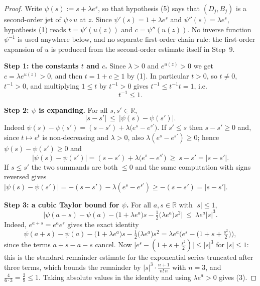 \begin{proof}
Write $\psi(s):=s+\lambda e^{s}$, so that hypothesis (5) says that $(D_j,B_j)$ is a
second-order jet of $\psi\circ u$ at $z$. Since $\psi'(s)=1+\lambda e^{s}$ and
$\psi''(s)=\lambda e^{s}$, hypothesis (1) reads $t=\psi'(u(z))$ and $c=\psi''(u(z))$. No
inverse function $\psi^{-1}$ is used anywhere below, and no separate first-order chain rule:
the first-order expansion of $u$ is produced from the second-order estimate itself in
Step~9.

\medskip\noindent\textbf{Step 1: the constants $t$ and $c$.} Since $\lambda>0$ and
$e^{u(z)}>0$ we get $c=\lambda e^{u(z)}>0$, and then $t=1+c\ge1$ by (1). In particular
$t>0$, so $t\ne0$, $t^{-1}>0$, and multiplying $1\le t$ by $t^{-1}>0$ gives
$t^{-1}\le t^{-1}t=1$, i.e.
\[
 t^{-1}\le1. \tag{1}
\]

\medskip\noindent\textbf{Step 2: $\psi$ is expanding.} For all $s,s'\in\mathbb R$,
\[
 |s-s'|\ \le\ |\psi(s)-\psi(s')| . \tag{2}
\]
Indeed $\psi(s)-\psi(s')=(s-s')+\lambda\big(e^{s}-e^{s'}\big)$. If $s'\le s$ then
$s-s'\ge0$ and, since $t\mapsto e^{t}$ is non-decreasing and $\lambda>0$, also
$\lambda(e^{s}-e^{s'})\ge0$; hence $\psi(s)-\psi(s')\ge0$ and
\[
 |\psi(s)-\psi(s')|=(s-s')+\lambda\big(e^{s}-e^{s'}\big)\ \ge\ s-s'=|s-s'| .
\]
If $s\le s'$ the two summands are both $\le0$ and the same computation with signs reversed
gives $|\psi(s)-\psi(s')|=-(s-s')-\lambda(e^{s}-e^{s'})\ge-(s-s')=|s-s'|$.

\medskip\noindent\textbf{Step 3: a cubic Taylor bound for $\psi$.} For all
$a,s\in\mathbb R$ with $|s|\le1$,
\[
 \Big|\psi(a+s)-\psi(a)-\big(1+\lambda e^{a}\big)s
   -\tfrac12\big(\lambda e^{a}\big)s^{2}\Big|
 \ \le\ \lambda e^{a}|s|^{3} . \tag{3}
\]
Indeed, $e^{a+s}=e^{a}e^{s}$ gives the exact identity
\[
 \psi(a+s)-\psi(a)-\big(1+\lambda e^{a}\big)s-\tfrac12\big(\lambda e^{a}\big)s^{2}
  =\lambda e^{a}\Big(e^{s}-\big(1+s+\tfrac{s^{2}}2\big)\Big),
\]
since the terms $a+s-a-s$ cancel. Now $\big|e^{s}-(1+s+\frac{s^{2}}2)\big|\le|s|^{3}$ for
$|s|\le1$: this is the standard remainder estimate for the exponential series truncated
after three terms, which bounds the remainder by
$|s|^{3}\cdot\frac{n+1}{n!\,n}$ with $n=3$, and $\frac{4}{6\cdot3}=\frac29\le1$. Taking
absolute values in the identity and using $\lambda e^{a}>0$ gives (3).


\end{proof}
